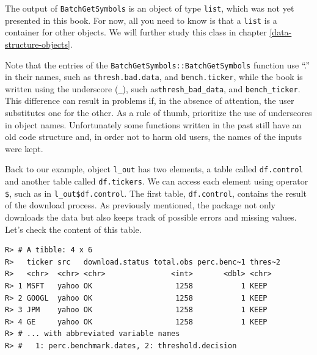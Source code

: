 \documentclass[
  12pt,
]{book}
\newenvironment{Shaded}{\begin{snugshade}}{\end{snugshade}}
\newcommand{\CommentTok}[1]{\textcolor[rgb]{0.37,0.37,0.37}{\textit{#1}}}
\newcommand{\FunctionTok}[1]{\textcolor[rgb]{0,0,0}{#1}}
\newcommand{\NormalTok}[1]{#1}
\newcommand{\SpecialCharTok}[1]{\textcolor[rgb]{0,0,0}{#1}}
\newenvironment{rmdcaution}
{\begin{cautionblock}
		
	} {\end{cautionblock}}
\begin{document}
The output of \texttt{BatchGetSymbols} is an object of type \texttt{list}, which was not yet presented in this book. For now, all you need to know is that a \texttt{list} is a container for other objects. We will further study this class in chapter \ref{data-structure-objects}.

\begin{rmdcaution}
Note that the entries of the \texttt{BatchGetSymbols::BatchGetSymbols}
function use ``.'' in their names, such as \texttt{thresh.bad.data}, and
\texttt{bench.ticker}, while the book is written using the underscore
(\texttt{\_}), such as\texttt{thresh\_bad\_data}, and
\texttt{bench\_ticker}. This difference can result in problems if, in
the absence of attention, the user substitutes one for the other. As a
rule of thumb, prioritize the use of underscores in object names.
Unfortunately some functions written in the past still have an old code
structure and, in order not to harm old users, the names of the inputs
were kept.
\end{rmdcaution}

Back to our example, object \texttt{l\_out} has two elements, a table called \texttt{df.control} and another table called \texttt{df.tickers}. We can access each element using operator \texttt{\$}, such as in \texttt{l\_out\$df.control}. The first table, \texttt{df.control}, contains the result of the download process. As previously mentioned, the package not only downloads the data but also keeps track of possible errors and missing values. Let's check the content of this table.

\begin{Shaded}
\end{Shaded}

\begin{verbatim}
R> # A tibble: 4 x 6
R>   ticker src   download.status total.obs perc.benc~1 thres~2
R>   <chr>  <chr> <chr>               <int>       <dbl> <chr>  
R> 1 MSFT   yahoo OK                   1258           1 KEEP   
R> 2 GOOGL  yahoo OK                   1258           1 KEEP   
R> 3 JPM    yahoo OK                   1258           1 KEEP   
R> 4 GE     yahoo OK                   1258           1 KEEP   
R> # ... with abbreviated variable names
R> #   1: perc.benchmark.dates, 2: threshold.decision
\end{verbatim}
\end{document}
